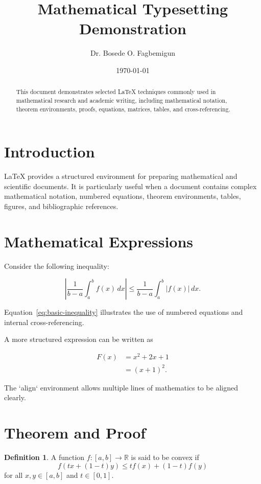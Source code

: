 \documentclass[12pt,a4paper]{article}
\title{Mathematical Typesetting Demonstration}
\author{Dr. Bosede O. Fagbemigun}
\date{\today}
\theoremstyle{definition}
\newtheorem{definition}{Definition}
\begin{document}
\maketitle

\begin{abstract}
This document demonstrates selected LaTeX techniques commonly
used in mathematical research and academic writing, including
mathematical notation, theorem environments, proofs, equations,
matrices, tables, and cross-referencing.
\end{abstract}

\section{Introduction}

LaTeX provides a structured environment for preparing mathematical
and scientific documents. It is particularly useful when a document
contains complex mathematical notation, numbered equations,
theorem environments, tables, figures, and bibliographic references.

\section{Mathematical Expressions}

Consider the following inequality:

\begin{equation}
\left|
\frac{1}{b-a}\int_a^b f(x)\,dx
\right|
\leq
\frac{1}{b-a}\int_a^b |f(x)|\,dx.
\label{eq:basic-inequality}
\end{equation}

Equation~\eqref{eq:basic-inequality} illustrates the use of numbered
equations and internal cross-referencing.

A more structured expression can be written as

\begin{align}
F(x)
&= x^2 + 2x + 1 \\
&= (x+1)^2.
\label{eq:factorization}
\end{align}

The `align` environment allows multiple lines of mathematics to be
aligned clearly.

\section{Theorem and Proof}

\begin{definition}
A function $f:[a,b]\rightarrow\mathbb{R}$ is said to be convex if
\[
f(tx+(1-t)y)
\leq
tf(x)+(1-t)f(y)
\]
for all $x,y\in[a,b]$ and $t\in[0,1]$.
\end{definition}
\end{document}
